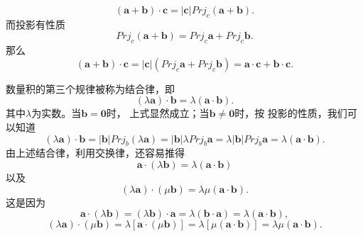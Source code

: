 \begin{equation}
    (\boldsymbol{a}+\boldsymbol{b})\cdot \boldsymbol{c}=
    | \boldsymbol{c}|Prj_c(\boldsymbol{a}+\boldsymbol{b}) .
\end{equation}
而投影有性质
\begin{equation}
    Prj_c(\boldsymbol{a}+\boldsymbol{b})=
    Prj_c\boldsymbol{a}+Prj_c\boldsymbol{b}.
\end{equation}
那么 
\begin{equation}
    (\boldsymbol{a}+\boldsymbol{b})\cdot \boldsymbol{c}=
    | \boldsymbol{c}|(Prj_c\boldsymbol{a}+Prj_c\boldsymbol{b})
    =\boldsymbol{a}\cdot \boldsymbol{c}
    +\boldsymbol{b}\cdot \boldsymbol{c}.
\end{equation}

数量积的第三个规律被称为结合律，即 
\begin{equation}
    (\lambda\boldsymbol{a})\cdot \boldsymbol{b}
    =\lambda (\boldsymbol{a}\cdot \boldsymbol{b}).
\end{equation}
其中$\lambda$为实数。当$\boldsymbol{b}=\boldsymbol{0}$时，
上式显然成立；当$\boldsymbol{b}\neq \boldsymbol{0}$时，按
投影的性质，我们可以知道 
\begin{equation}
    (\lambda\boldsymbol{a})\cdot \boldsymbol{b}
    =| \boldsymbol{b}|Prj_b(\lambda \boldsymbol{a})
    =| \boldsymbol{b}|\lambda Prj_b\boldsymbol{a}
    =\lambda | \boldsymbol{b}|Prj_b\boldsymbol{a}
    =\lambda (\boldsymbol{a}\cdot \boldsymbol{b}).
\end{equation}
由上述结合律，利用交换律，还容易推得
\begin{equation}
    \boldsymbol{a}\cdot (\lambda \boldsymbol{b})=
    \lambda (\boldsymbol{a}\cdot \boldsymbol{b})
\end{equation}
以及 
\begin{equation}
    (\lambda \boldsymbol{a})\cdot (\mu \boldsymbol{b})=
    \lambda \mu(\boldsymbol{a}\cdot \boldsymbol{b}).
\end{equation}
这是因为
\begin{equation}
    \boldsymbol{a}\cdot (\lambda\boldsymbol{b})=
    (\lambda\boldsymbol{b})\cdot \boldsymbol{a}=
    \lambda(\boldsymbol{b}\cdot \boldsymbol{a})=
    \lambda (\boldsymbol{a}\cdot \boldsymbol{b}),
\end{equation}
\begin{equation}
    (\lambda \boldsymbol{a})\cdot (\mu \boldsymbol{b})=
    \lambda [\boldsymbol{a}\cdot (\mu\boldsymbol{b})]=
    \lambda [\mu(\boldsymbol{a}\cdot \boldsymbol{b})]=
    \lambda \mu(\boldsymbol{a}\cdot \boldsymbol{b}).
\end{equation}

